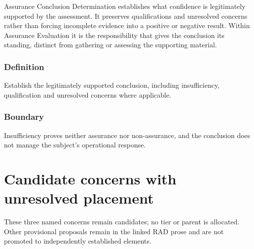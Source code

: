 Assurance Conclusion Determination establishes what confidence is legitimately supported by the assessment. It preserves qualifications and unresolved concerns rather than forcing incomplete evidence into a positive or negative result. Within Assurance Evaluation it is the responsibility that gives the conclusion its standing, distinct from gathering or assessing the supporting material.

\subsubsection*{Definition}

Establish the legitimately supported conclusion, including insufficiency, qualification and unresolved concerns where applicable.

\subsubsection*{Boundary}

Insufficiency proves neither assurance nor non-assurance, and the conclusion does not manage the subject's operational response.

\section{Candidate concerns with unresolved placement}
These three named concerns remain candidates; no tier or parent is allocated. Other provisional proposals remain in the linked RAD prose and are not promoted to independently established elements.
